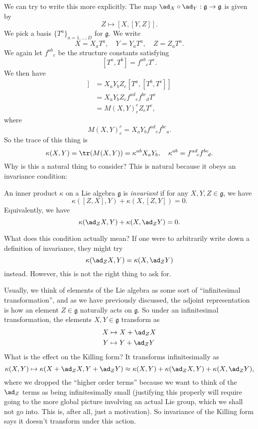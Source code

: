 \documentclass[a4paper]{article}
\begin{document}
We can try to write this more explicitly. The map $\ad_X \circ \ad_Y: \mathfrak{g} \to \mathfrak{g}$ is given by
\[
  Z \mapsto [X, [Y, Z]].
\]
We pick a basis $\{T^a\}_{a = 1, \ldots, D}$ for $\mathfrak{g}$. We write
\[
  X = X_aT^a,\quad Y = Y_aT^a,\quad Z = Z_aT^a.
\]
We again let $f^{ab}\!_c$ be the structure constants satisfying
\[
  [T^a, T^b] = f^{ab}\!_c T^c.
\]
We then have
\begin{align*}
  [X, [Y, Z]] &= X_a Y_b Z_ c [T^a, [T^b, T^c]]\\
  &= X_a Y_b Z_c f^{ad}\!_e f^{bc}\!_d T^e\\
  &= M(X, Y)^c_e Z_c T^e,
\end{align*}
where
\[
  M(X, Y)^c_e = X_a Y_b f^{ad}\!_e f^{bc}\!_a.
\]
So the trace of this thing is
\[
  \kappa(X, Y) = \tr(M(X, Y)) = \kappa^{ab}X_a Y_b,\quad \kappa^{ab} = f^{ad}\!_c f^{bc}\!_d.
\]
Why is this a natural thing to consider? This is natural because it obeys an invariance condition:
\begin{defi}
  An inner product $\kappa$ on a Lie algebra $\mathfrak{g}$ is \emph{invariant} if for any $X, Y, Z \in \mathfrak{g}$, we have
  \[
    \kappa([Z, X], Y)+ \kappa(X, [Z, Y]) = 0.
  \]
  Equivalently, we have
  \[
    \kappa(\ad_Z X, Y) + \kappa(X, \ad_Z Y) = 0.
  \]
\end{defi}
What does this condition actually mean? If one were to arbitrarily write down a definition of invariance, they might try
\[
  \kappa(\ad_Z X, Y) = \kappa(X, \ad_Z Y)
\]
instead. However, this is not the right thing to ask for.

Usually, we think of elements of the Lie algebra as some sort of ``infinitesimal transformation'', and as we have previously discussed, the adjoint representation is how an element $Z \in \mathfrak{g}$ naturally acts on $\mathfrak{g}$. So under an infinitesimal transformation, the elements $X, Y \in \mathfrak{g}$ transform as
\begin{align*}
  X &\mapsto X + \ad_Z X\\
  Y &\mapsto Y + \ad_Z Y
\end{align*}
What is the effect on the Killing form? It transforms infinitesimally as
\[
  \kappa(X, Y) \mapsto \kappa(X + \ad_Z X, Y + \ad_Z Y) \approx \kappa(X, Y) + \kappa(\ad_Z X, Y)+ \kappa(X, \ad_Z Y),
\]
where we dropped the ``higher order terms'' because we want to think of the $\ad_Z$ terms as being infinitesimally small (justifying this properly will require going to the more global picture involving an actual Lie group, which we shall not go into. This is, after all, just a motivation). So invariance of the Killing form says it doesn't transform under this action.
\end{document}
